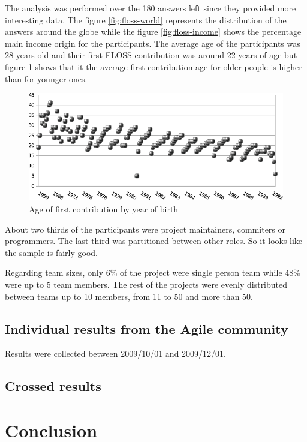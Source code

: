 \documentclass[lnbip]{svmultln}
\begin{document}
The analysis was performed over the 180 answers left since they
provided more interesting data. The figure \ref{fig:floss-world}
represents the distribution of the answers around the globe while the
figure \ref{fig:floss-income} shows the percentage main income origin
for the participants. The average age of the participants was 28 years
old and their first FLOSS contribution was around 22 years of age but
figure \ref{fig:floss-firstxp} shows that it the average first
contribution age for older people is higher than for younger ones.

\begin{figure}[htb]
  \centering
  \includegraphics{floss-firstxp.pdf}
  \caption{Age of first contribution by year of birth}
  \label{fig:floss-firstxp}
\end{figure}

About two thirds of the participants were project maintainers,
commiters or programmers. The last third was partitioned between other
roles. So it looks like the sample is fairly good.

Regarding team sizes, only 6\% of the project were single person team
while 48\% were up to 5 team members. The rest of the projects were
evenly distributed between teams up to 10 members, from 11 to 50 and
more than 50.

\subsection{Individual results from the Agile community}
\label{subsec:agile-results}

Results were collected between 2009/10/01 and 2009/12/01.

\subsection{Crossed results}
\label{subsec:crossed-results}

\section{Conclusion}
\label{sec:conclusion}
\end{document}
